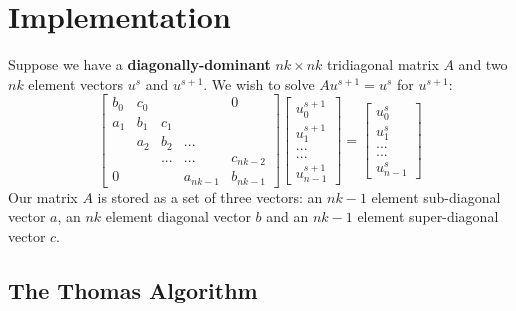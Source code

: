 \documentclass{sig-alternate}
\begin{document}
\section{Implementation}
\label{sec:impl}

Suppose we have a \textbf{diagonally-dominant} \(nk \times nk\) tridiagonal
  matrix \(A\) and two \(nk\) element vectors \(u^{s}\) and \(u^{s+1}\). 
  We wish to solve \(Au^{s+1} = u^{s}\) for \(u^{s+1}\):
\[
\begin{bmatrix}
b_0 & c_0 &     &          & 0        \\
a_1 & b_1 & c_1 &          &          \\
    & a_2 & b_2 & ...      &          \\
    &     & ... & ...      & c_{nk-2} \\
0   &     &     & a_{nk-1} & b_{nk-1}
\end{bmatrix}
\begin{bmatrix}
u^{s+1}_0     \\
u^{s+1}_1     \\
...     \\
...     \\
u^{s+1}_{n-1}
\end{bmatrix}
=
\begin{bmatrix}
u^{s}_0     \\
u^{s}_1     \\
...     \\
...     \\
u^{s}_{n-1}
\end{bmatrix}
\]
Our matrix \(A\) is stored as a set of three vectors: an \(nk-1\) element
  sub-diagonal vector \(a\), an \(nk\) element diagonal vector \(b\) and an
  \(nk-1\) element super-diagonal vector \(c\).

\subsection{The Thomas Algorithm}
\label{sec:impl:thomas_algorithm}
\end{document}
